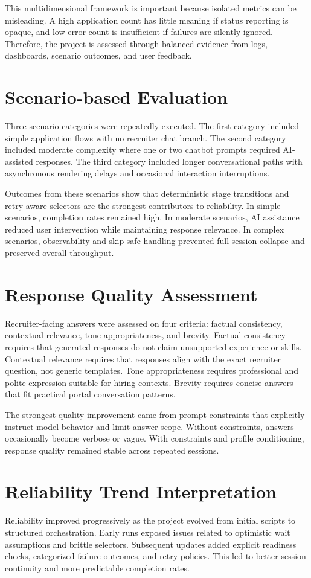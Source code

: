\documentclass[12pt,a4paper,oneside]{report}
\begin{document}
This multidimensional framework is important because isolated metrics can be misleading. A high application count has little meaning if status reporting is opaque, and low error count is insufficient if failures are silently ignored. Therefore, the project is assessed through balanced evidence from logs, dashboards, scenario outcomes, and user feedback.

\section{Scenario-based Evaluation}
Three scenario categories were repeatedly executed. The first category included simple application flows with no recruiter chat branch. The second category included moderate complexity where one or two chatbot prompts required AI-assisted responses. The third category included longer conversational paths with asynchronous rendering delays and occasional interaction interruptions.

Outcomes from these scenarios show that deterministic stage transitions and retry-aware selectors are the strongest contributors to reliability. In simple scenarios, completion rates remained high. In moderate scenarios, AI assistance reduced user intervention while maintaining response relevance. In complex scenarios, observability and skip-safe handling prevented full session collapse and preserved overall throughput.

\section{Response Quality Assessment}
Recruiter-facing answers were assessed on four criteria: factual consistency, contextual relevance, tone appropriateness, and brevity. Factual consistency requires that generated responses do not claim unsupported experience or skills. Contextual relevance requires that responses align with the exact recruiter question, not generic templates. Tone appropriateness requires professional and polite expression suitable for hiring contexts. Brevity requires concise answers that fit practical portal conversation patterns.

The strongest quality improvement came from prompt constraints that explicitly instruct model behavior and limit answer scope. Without constraints, answers occasionally become verbose or vague. With constraints and profile conditioning, response quality remained stable across repeated sessions.

\section{Reliability Trend Interpretation}
Reliability improved progressively as the project evolved from initial scripts to structured orchestration. Early runs exposed issues related to optimistic wait assumptions and brittle selectors. Subsequent updates added explicit readiness checks, categorized failure outcomes, and retry policies. This led to better session continuity and more predictable completion rates.
\end{document}
